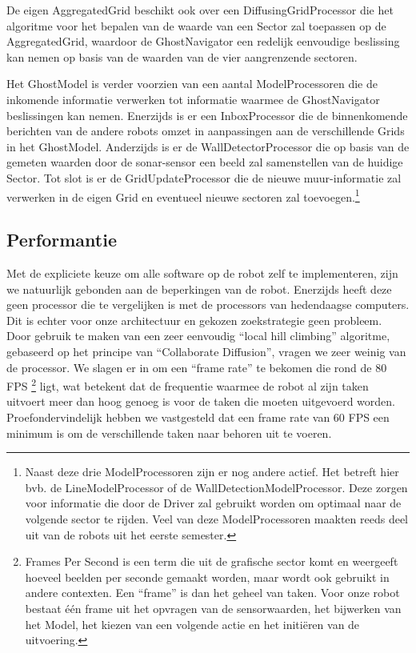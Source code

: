 \documentclass[12pt,a4paper]{report}
\begin{document}
De eigen AggregatedGrid beschikt ook over een DiffusingGridProcessor die het algoritme voor het bepalen van de waarde van een Sector zal toepassen op de AggregatedGrid, waardoor de GhostNavigator een redelijk eenvoudige beslissing kan nemen op basis van de waarden van de vier aangrenzende sectoren.

Het GhostModel is verder voorzien van een aantal ModelProcessoren die de inkomende informatie verwerken tot informatie waarmee de GhostNavigator beslissingen kan nemen. Enerzijds is er een InboxProcessor die de binnenkomende berichten van de andere robots omzet in aanpassingen aan de verschillende Grids in het GhostModel. Anderzijds is er de WallDetectorProcessor die op basis van de gemeten waarden door de sonar-sensor een beeld zal samenstellen van de huidige Sector. Tot slot is er de GridUpdateProcessor die de nieuwe muur-informatie zal verwerken in de eigen Grid en eventueel nieuwe sectoren zal toevoegen.\footnote{Naast deze drie ModelProcessoren zijn er nog andere actief. Het betreft hier bvb. de LineModelProcessor of de WallDetectionModelProcessor. Deze zorgen voor informatie die door de Driver zal gebruikt worden om optimaal naar de volgende sector te rijden. Veel van deze ModelProcessoren maakten reeds deel uit van de robots uit het eerste semester.}

\subsection{Performantie}
\label{sect:performance}

Met de expliciete keuze om alle software op de robot zelf te implementeren, zijn we natuurlijk gebonden aan de beperkingen van de robot. Enerzijds heeft deze geen processor die te vergelijken is met de processors van hedendaagse computers. Dit is echter voor onze architectuur en gekozen zoekstrategie geen probleem. Door gebruik te maken van een zeer eenvoudig ``local hill climbing'' algoritme, gebaseerd op het principe van ``Collaborate Diffusion'', vragen we zeer weinig van de processor. We slagen er in om een ``frame rate'' te bekomen die rond de 80 FPS \footnote{Frames Per Second is een term die uit de grafische sector komt en weergeeft hoeveel beelden per seconde gemaakt worden, maar wordt ook gebruikt in andere contexten. Een ``frame'' is dan het geheel van taken. Voor onze robot bestaat \'e\'en frame uit het opvragen van de sensorwaarden, het bijwerken van het Model, het kiezen van een volgende actie en het initi\"eren van de uitvoering.} ligt, wat betekent dat de frequentie waarmee de robot al zijn taken uitvoert meer dan hoog genoeg is voor de taken die moeten uitgevoerd worden. Proefondervindelijk hebben we vastgesteld dat een frame rate van 60 FPS een minimum is om de verschillende taken naar behoren uit te voeren.
\end{document}
